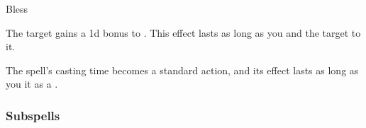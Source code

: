 \newpage
\begin{spellsection}{Bless}

\begin{spellheader}
\end{spellheader}

\begin{spellcontent}

\begin{spelltargetinginfo}



\end{spelltargetinginfo}


\begin{spelleffects}



\spelleffect
The target gains a \plus1d bonus to .
This effect lasts as long as you and the target  to it.






\end{spelleffects}

\end{spellcontent}
\begin{spellfooter}


\end{spellfooter}
\begin{spellsubcontent}


\begin{spellcantrip}
The spell's casting time becomes a standard action, and its effect lasts as long as you  it as a .
\end{spellcantrip}


\end{spellsubcontent}
\end{spellsection}


\subsubsection{Subspells}





